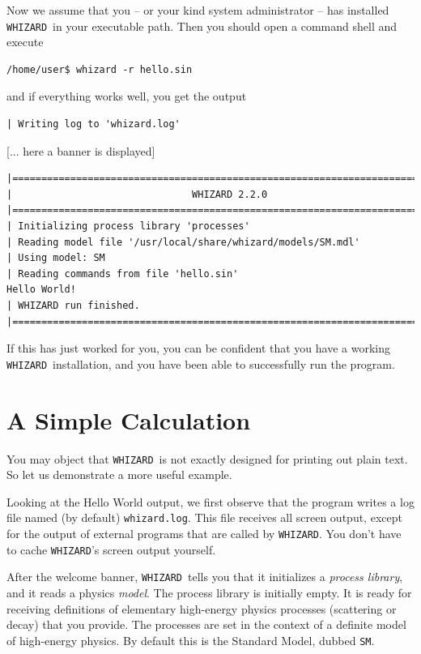 \documentclass[12pt]{book}
\newcommand{\whizard}{\texttt{WHIZARD}}
\begin{document}
Now we assume that you -- or your kind system administrator -- has
installed \whizard\ in your executable path.  Then you should open a
command shell and execute
\begin{verbatim}
/home/user$ whizard -r hello.sin
\end{verbatim}
and if everything works well, you get the output
\begin{footnotesize}
\begin{verbatim}
| Writing log to 'whizard.log'
\end{verbatim}
\centerline{[... here a banner is displayed]}
\begin{verbatim}
|=============================================================================|
|                               WHIZARD 2.2.0
|=============================================================================|
| Initializing process library 'processes'
| Reading model file '/usr/local/share/whizard/models/SM.mdl'
| Using model: SM
| Reading commands from file 'hello.sin'
Hello World!
| WHIZARD run finished.
|=============================================================================|
\end{verbatim}
\end{footnotesize}
If this has just worked for you, you can be confident that you have a working
\whizard\ installation, and you have been able to successfully run the
program.


\section{A Simple Calculation}
You may object that \whizard\ is not exactly designed for printing out
plain text.  So let us demonstrate a more useful example.

Looking at the Hello World output, we first observe that the program
writes a log file named (by default) \verb|whizard.log|.  This file
receives all screen output, except for the output of external programs
that are called by \whizard.  You don't have to cache \whizard's screen
output yourself.

After the welcome banner, \whizard\ tells you that it initializes a
\emph{process library}, and it reads a physics \emph{model}.  The
process library is initially empty.  It is ready for receiving
definitions of elementary high-energy physics processes (scattering or
decay) that you provide.  The processes are set in the context of a
definite model of high-energy physics.  By default this is the
Standard Model, dubbed \verb|SM|.
\end{document}
